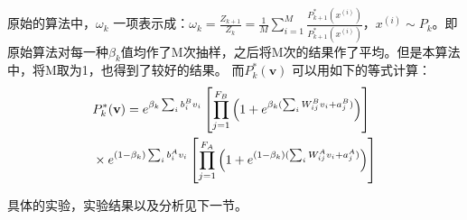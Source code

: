 \documentclass[journal,a4paper]{IEEEtran}
\begin{document}
		原始的算法中，$ \omega_k $ 一项表示成：$ \omega_k = \frac{Z_{k+1}}{Z_k} =\frac{1}{M} \sum_{i = 1}^{M} \frac{P_{k+1}^*(x^{(i)})}{P_{k+1}^*(x^{(i)})}$，$x^{(i)} \sim P_k$。即原始算法对每一种$\beta_k$值均作了M次抽样，之后将M次的结果作了平均。但是本算法中，将M取为1，也得到了较好的结果。
		而$P_k^*(\mathbf{v})$ 可以用如下的等式计算：
		\begin{align}
		 & P_k^*(\mathbf{v}) = e^{\beta_k\sum_i b_i^Bv_i} \left[\prod_{j=1}^{F_B} \left(1+e^{\beta_k(\sum_i W_{ij}^Bv_i+a_j^B)}\right)\right] \notag\\
		 & \times e^{(1-\beta_k)\sum_i b_i^Av_i} \left[\prod_{j=1}^{F_A} \left(1+e^{(1-\beta_k)(\sum_i W_{ij}^Av_i+a_j^A)}\right)\right]
		 \label{equ8}
		\end{align}

		具体的实验，实验结果以及分析见下一节。
\end{document}
